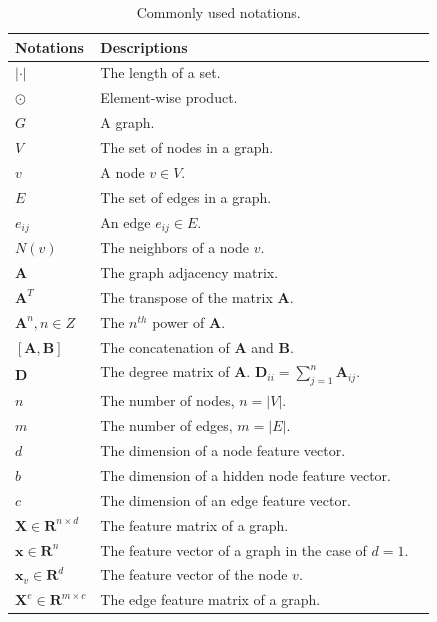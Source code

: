	\begin{table}[t]
		\caption{Commonly used notations.}
		\label{tab:notations}
		\centering
		\begin{tabular} {  l l p{7cm} } \toprule
				\textbf{Notations}& \textbf{Descriptions} \\ \midrule
			    $|\cdot|$ & The length of a set. \\ \hline
				$\odot$ & Element-wise product. \\ \hline
				$G$& A graph. \\ \hline
				$V$& The set of nodes in a graph.\\ \hline
				$v$ & A node $v\in V$. \\ \hline
			    $E$& The set of edges in a graph.\\ \hline
				$e_{ij}$ & An edge $e_{ij}\in E$.\\ \hline
				$N(v)$ & The neighbors of a node $v$. \\ \hline
				$\mathbf{A}$ & The graph adjacency matrix.  \\ \hline
				$\mathbf{A}^T$ & The transpose of the matrix
				$\mathbf{A}$. \\ \hline
				$\mathbf{A}^n, n\in Z$ & The $n^{th}$ power of
				$\mathbf{A}$. \\ \hline
				$[\mathbf{A},\mathbf{B}]$ & The concatenation of $\mathbf{A}$ and $\mathbf{B}$. \\ \hline
                $\mathbf{D}$ & The degree matrix of $\mathbf{A}$. $\mathbf{D}_{ii} = \sum_{j=1}^n \mathbf{A}_{ij}$. \\ \hline
				$n$ & The number of nodes, $n = |V|$. \\ \hline
				$m$ & The number of edges, $m = |E|$. \\ \hline
				$d$  & The dimension of a node feature vector.\\ \hline
				$b$ & The dimension of a hidden node feature vector. \\ \hline
			    $c$  & The dimension of an edge feature vector.\\ \hline
				$\mathbf{X} \in \mathbf{R}^{n\times d}$ & The feature matrix of a graph. \\ \hline
				$\mathbf{x} \in \mathbf{R}^n$ & The feature vector of a graph in the case of $d=1$. \\ \hline
				$\mathbf{x}_v \in \mathbf{R}^d$ & The feature vector of the node $v$. \\ \hline
				$\mathbf{X}^e \in \mathbf{R}^{m\times c}$ & The edge feature matrix of a graph. \\ \hline

\end{tabular}
\end{table}
